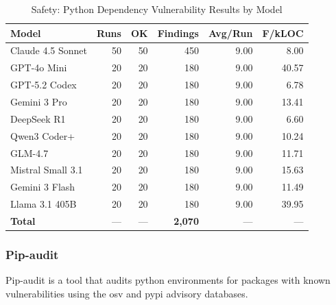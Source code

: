 \begin{table}[htbp]
    \centering
    \caption{Safety: Python Dependency Vulnerability Results by Model}
    \label{tab:tool_safety}
    \small
    \begin{tabular}{@{} l r r r r r @{}}
        \toprule
        \textbf{Model} & \textbf{Runs} & \textbf{OK} & \textbf{Findings} & \textbf{Avg/Run} & \textbf{F/kLOC} \\
        \midrule
        Claude 4.5 Sonnet & 50 & 50 & 450 & 9.00 & 8.00 \\
        GPT-4o Mini & 20 & 20 & 180 & 9.00 & 40.57 \\
        GPT-5.2 Codex & 20 & 20 & 180 & 9.00 & 6.78 \\
        Gemini 3 Pro & 20 & 20 & 180 & 9.00 & 13.41 \\
        DeepSeek R1 & 20 & 20 & 180 & 9.00 & 6.60 \\
        Qwen3 Coder+ & 20 & 20 & 180 & 9.00 & 10.24 \\
        GLM-4.7 & 20 & 20 & 180 & 9.00 & 11.71 \\
        Mistral Small 3.1 & 20 & 20 & 180 & 9.00 & 15.63 \\
        Gemini 3 Flash & 20 & 20 & 180 & 9.00 & 11.49 \\
        Llama 3.1 405B & 20 & 20 & 180 & 9.00 & 39.95 \\
        \midrule
        \textbf{Total} & --- & --- & \textbf{2{,}070} & --- & --- \\
        \bottomrule
    \end{tabular}
\end{table}

\subsubsection{Pip-audit}

Pip-audit is a tool that audits python environments for packages with known vulnerabilities using the osv and pypi advisory databases.

